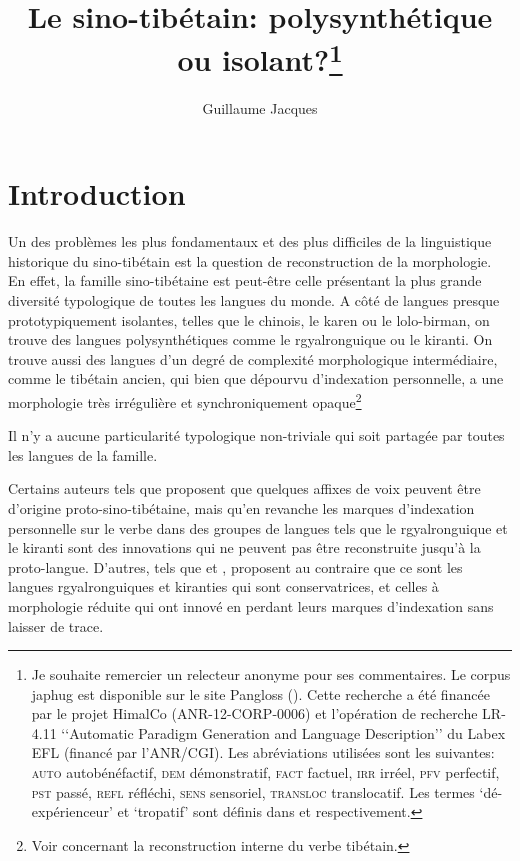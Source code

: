 \documentclass[oldfontcommands,oneside,a4paper,11pt]{article}
\begin{document}
 
\title{Le sino-tibétain: polysynthétique ou isolant?\footnote{Je souhaite remercier un relecteur anonyme pour ses commentaires. Le corpus japhug est disponible sur le site Pangloss (\citealt{michailovsky14pangloss}). Cette recherche a été financée par le projet HimalCo (ANR-12-CORP-0006) et l'opération de recherche LR-4.11 ‘‘Automatic Paradigm Generation and Language Description’’ du Labex EFL (financé par l'ANR/CGI).
Les abréviations utilisées sont les suivantes: \textsc{auto} autobénéfactif, \textsc{dem} démonstratif, \textsc{fact} factuel, \textsc{irr} irréel, \textsc{pfv} perfectif, \textsc{pst} passé, \textsc{refl} réfléchi,  \textsc{sens} sensoriel, \textsc{transloc} translocatif. Les termes `dé-expérienceur' et `tropatif' sont  définis dans \citet{jacques12demotion} et \citet{jacques13tropative} respectivement. }  }
\author{Guillaume Jacques}
\maketitle

\section{Introduction}
Un des problèmes les plus fondamentaux et des plus difficiles de la linguistique historique du sino-tibétain est la question de reconstruction de la morphologie. En effet, la famille sino-tibétaine est peut-être celle présentant la plus grande diversité typologique de toutes les langues du monde. A côté de langues presque prototypiquement isolantes, telles que le chinois, le karen ou le lolo-birman, on trouve des langues polysynthétiques comme le rgyalronguique ou le kiranti. On trouve aussi des langues d'un degré de complexité morphologique intermédiaire, comme le tibétain ancien, qui bien que dépourvu d'indexation personnelle, a une morphologie très irrégulière et synchroniquement opaque\footnote{Voir \citet{hill05vbri, jacques10ndr, jacques12internal, hill14dempsey, hill14voicing, hill15lan} concernant la reconstruction interne du verbe tibétain.}

 


 Il n'y a aucune particularité typologique non-triviale qui soit partagée par toutes les langues de la famille. 

Certains auteurs tels que  \citet{lapolla03} proposent que quelques affixes de voix peuvent être d'origine proto-sino-tibétaine, mais qu'en revanche les marques d'indexation personnelle sur le verbe dans des groupes de langues tels que le rgyalronguique et le kiranti sont des innovations qui ne peuvent pas être reconstruite jusqu'à la proto-langue. D'autres, tels que  \citet{driem93agreement}  et \citet{delancey10agreement}, proposent au contraire que ce sont les langues rgyalronguiques et kiranties qui sont conservatrices, et celles à morphologie réduite qui ont innové en perdant leurs marques d'indexation sans laisser de trace.
\end{document}
